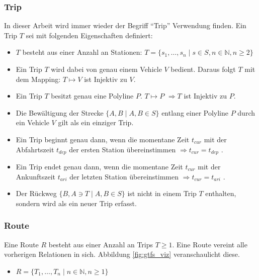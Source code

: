 \begin{newpage}
    \subsubsection{Trip}
    \label{ssub:trip}
      In dieser Arbeit wird immer wieder der Begriff "`Trip"' Verwendung finden. Ein Trip $T$ sei mit folgenden Eigenschaften definiert:
      \begin{itemize}
        \item $T$ besteht aus einer Anzahl an Stationen: $T = \{s_1, \dotsc, s_n \;|\; s \in S, n \in \mathbb{N}, n \geq 2 \}$

        \item Ein Trip $T$ wird dabei von genau einem Vehicle $V$ bedient. Daraus folgt $T$ mit dem Mapping: $T \mapsto V$ ist Injektiv zu $V$. 

        \item Ein Trip $T$ besitzt genau eine Polyline $P$. $T \mapsto P$ $ \Rightarrow T$ ist Injektiv zu $P$. 

        \item Die Bewältigung der Strecke $\{A,B \;|\; A, B \in S\}$ entlang einer Polyline $P$ durch ein Vehicle $V$ gilt als ein einziger Trip.

        \item Ein Trip beginnt genau dann, wenn die momentane Zeit $t_{cur}$ mit der Abfahrtszeit $t_{dep}$ der ersten Station übereinstimmen $\Rightarrow t_{cur} = t_{dep} $ .

        \item Ein Trip endet genau dann, wenn die momentane Zeit $t_{cur}$ mit der Ankunftszeit $t_{ari}$ der letzten Station übereinstimmen $\Rightarrow t_{cur} = t_{ari} $ .

        \item Der Rückweg $\{B, A \ni T \;|\; A, B \in S\}$ ist nicht in einem Trip $T$ enthalten, sondern wird als ein neuer Trip erfasst.
      \end{itemize}
      

    \subsubsection{Route}
    \label{ssub:route}
      Eine Route $R$ besteht aus einer Anzahl an Trips $T \geq 1$. Eine Route vereint alle vorherigen Relationen in sich. Abbildung \ref{fig:gtfs_viz} veranschaulicht diese. 

      \begin{itemize}
        \item $R = \{ T_1, \dotsc, T_n \;|\; n \in \mathbb{N}, n \geq 1 \}$


\end{itemize}
\end{newpage}
